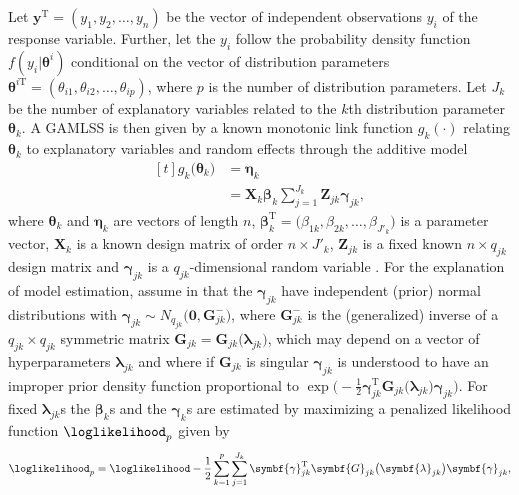 Let \(\symbf{y}^{\text{T}} = (y_1, y_2, \ldots, y_n)\) be the vector of independent observations \(y_i\) of the response variable.  Further, let the \(y_i\) follow the probability density function \(f(y_i|\symbf{\theta}^i)\) conditional on the vector of distribution parameters \(\symbf{\theta}^{i \text{T}} = (\theta_{i 1}, \theta_{i 2}, \ldots, \theta_{i p})\), where \(p\) is the number of distribution parameters. Let \(J_k\) be the number of explanatory variables related to the \(k\)th distribution parameter \(\symbf{\theta}_k\).  A GAMLSS is then given by a known monotonic link function \(g_k(\cdot)\) relating \(\symbf{\theta}_k\) to explanatory variables and random effects through the additive model 
\begin{equation}
  \label{eq:GAMLSSRigbyStasinopoulos2005}
  \begin{aligned}[t]
    g_k\bigl(\symbf{\theta}_k\bigr) &= \symbf{\eta}_k \\
    &= \symbf{X}_k \symbf{\beta}_k \sum_{j = 1}^{J_k} \symbf{Z}_{j k} \symbf{\gamma}_{j k},
\end{aligned}
\end{equation}
where \(\symbf{\theta}_k\) and \(\symbf{\eta}_k\) are vectors of length \(n\), \(\symbf{\beta}_k^{\text{T}} = \bigl(\beta_{1 k}, \beta_{2 k}, \ldots, \beta_{J'_k }\bigr)\) is a parameter vector, \(\symbf{X}_k\) is a known design matrix of order \(n \times J'_k\), \(\symbf{Z}_{j k}\) is a fixed known \(n \times q_{j k}\) design matrix and \(\symbf{\gamma}_{j k}\) is a \(q_{j k}\)-dimensional random variable \parencite{Rigby2005}.  For the explanation of model estimation, assume in  that the \(\symbf{\gamma}_{j k}\) have independent (prior) normal distributions with \(\symbf{\gamma}_{j k} \sim N_{q_{j k}}\bigl(\symbf{0}, \symbf{G}_{j k}^-\bigr)\), where \(\symbf{G}_{j k}^-\) is the (generalized) inverse of a \(q_{j k} \times q_{j k}\) symmetric matrix \(\symbf{G}_{j k} = \symbf{G}_{j k}\bigl(\symbf{\lambda}_{j k}\bigr)\), which may depend on a vector of hyperparameters \(\symbf{\lambda}_{j k}\) and where if \(\symbf{G}_{j k}\) is singular \(\symbf{\gamma}_{j k}\) is understood to have an improper prior density function proportional to \(\exp\bigl(-\frac{1}{2} \symbf{\gamma}_{j k}^{\text{T}} \symbf{G}_{j k}\bigl(\symbf{\lambda}_{j k}\bigr) \symbf{\gamma}_{j k}\bigr)\).  For fixed \(\symbf{\lambda}_{j k}\)s the \(\symbf{\beta}_k\)s and the \(\symbf{\gamma}_k\)s are estimated by maximizing a penalized likelihood function \(\loglikelihood_p\) given by
\begin{equation}
  \label{eq:GAMLSSRigbyStasinopoulos2005PenalizedLikelihood}
  \loglikelihood_p = \loglikelihood - \frac{1}{2} \sum_{k = 1}^p \sum_{j = 1}^{J_k} \symbf{\gamma}_{j k}^{\text{T}} \symbf{G}_{j k}\bigl(\symbf{\lambda}_{j k}\bigr) \symbf{\gamma}_{j k},
\end{equation}
